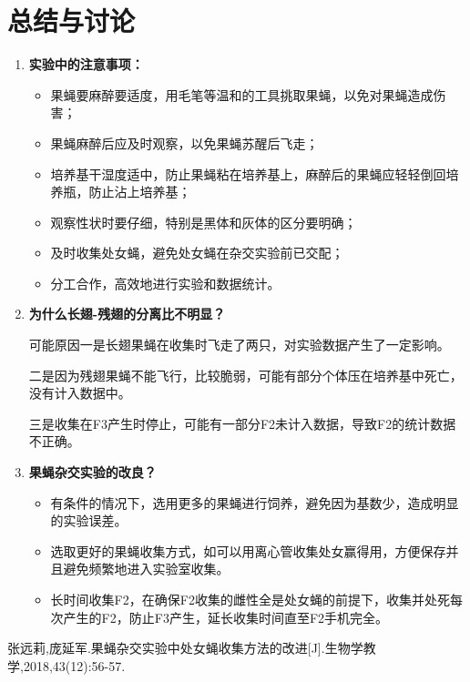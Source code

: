 \documentclass[UTF8]{article}
\begin{document}
    \section{总结与讨论}
    \begin{enumerate}
        \item {
          \textbf{实验中的注意事项：}
          \begin{itemize}
            \item 果蝇要麻醉要适度，用毛笔等温和的工具挑取果蝇，以免对果蝇造成伤害；
            \item 果蝇麻醉后应及时观察，以免果蝇苏醒后飞走；
            \item 培养基干湿度适中，防止果蝇粘在培养基上，麻醉后的果蝇应轻轻倒回培养瓶，防止沾上培养基；
            \item 观察性状时要仔细，特别是黑体和灰体的区分要明确；
            \item 及时收集处女蝇，避免处女蝇在杂交实验前已交配；
            \item 分工合作，高效地进行实验和数据统计。
          \end{itemize}
        }
        \item {
          \textbf{为什么长翅-残翅的分离比不明显？}

          可能原因一是长翅果蝇在收集时飞走了两只，对实验数据产生了一定影响。

          二是因为残翅果蝇不能飞行，比较脆弱，可能有部分个体压在培养基中死亡，没有计入数据中。

          三是收集在F3产生时停止，可能有一部分F2未计入数据，导致F2的统计数据不正确。
        }
        \item {
          \textbf{果蝇杂交实验的改良？}
          \begin{itemize}
            \item 有条件的情况下，选用更多的果蝇进行饲养，避免因为基数少，造成明显的实验误差。
            \item 选取更好的果蝇收集方式，如可以用离心管收集处女赢得用，方便保存并且避免频繁地进入实验室收集\textsuperscript{\cite{ref1}}。
            \item 长时间收集F2，在确保F2收集的雌性全是处女蝇的前提下，收集并处死每次产生的F2，防止F3产生，延长收集时间直至F2手机完全。
          \end{itemize}
        }
    \end{enumerate}
    \begin{thebibliography}{99}  
        张远莉,庞延军.果蝇杂交实验中处女蝇收集方法的改进[J].生物学教学,2018,43(12):56-57.
    \end{thebibliography}
\end{document}
